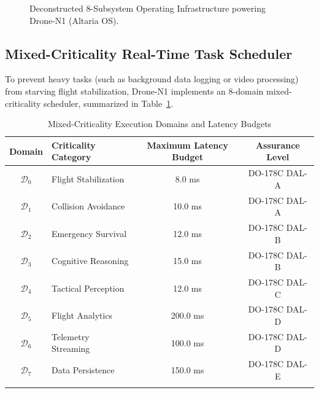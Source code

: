 \documentclass[pdflatex,sn-mathphys-num]{sn-jnl}%
\theoremstyle{thmstyleone}%
\theoremstyle{thmstyletwo}%
\theoremstyle{thmstylethree}%
\begin{document}
\begin{figure}[t]
{%
}
\caption{Deconstructed 8-Subsystem Operating Infrastructure powering Drone-N1 (Altaria OS).}
\label{fig:deconstructed_stack}
\end{figure}

\subsection{Mixed-Criticality Real-Time Task Scheduler}
To prevent heavy tasks (such as background data logging or video processing) from starving flight stabilization, Drone-N1 implements an 8-domain mixed-criticality scheduler, summarized in Table~\ref{tab:mixed_criticality}.

\begin{table}[h]
\caption{Mixed-Criticality Execution Domains and Latency Budgets}
\label{tab:mixed_criticality}
\centering
\begin{tabular}{clcc}
\toprule
Domain & Criticality Category & Maximum Latency Budget & Assurance Level \\
\midrule
$\mathcal{D}_0$ & Flight Stabilization & 8.0 ms & DO-178C DAL-A \\
$\mathcal{D}_1$ & Collision Avoidance & 10.0 ms & DO-178C DAL-A \\
$\mathcal{D}_2$ & Emergency Survival & 12.0 ms & DO-178C DAL-B \\
$\mathcal{D}_3$ & Cognitive Reasoning & 15.0 ms & DO-178C DAL-B \\
$\mathcal{D}_4$ & Tactical Perception & 12.0 ms & DO-178C DAL-C \\
$\mathcal{D}_5$ & Flight Analytics & 200.0 ms & DO-178C DAL-D \\
$\mathcal{D}_6$ & Telemetry Streaming & 100.0 ms & DO-178C DAL-D \\
$\mathcal{D}_7$ & Data Persistence & 150.0 ms & DO-178C DAL-E \\
\botrule
\end{tabular}
\end{table}
\end{document}

